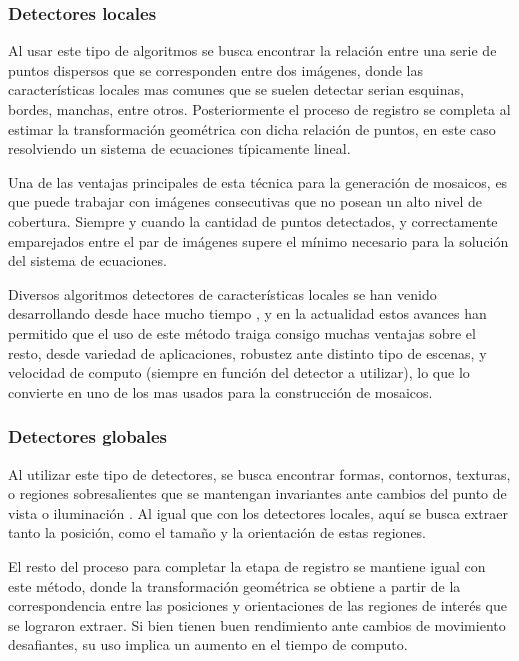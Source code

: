 \subsubsection*{Detectores locales}

Al usar este tipo de algoritmos se busca encontrar la relación entre una serie de puntos dispersos que se corresponden entre dos imágenes, donde las características locales mas comunes que se suelen detectar serian esquinas, bordes, manchas, entre otros. Posteriormente el proceso de registro se completa al estimar la transformación geométrica con dicha relación de puntos, en este caso resolviendo un sistema de ecuaciones típicamente lineal.

Una de las ventajas principales de esta técnica para la generación de mosaicos, es que puede trabajar con imágenes consecutivas que no posean un alto nivel de cobertura. Siempre y cuando la cantidad de puntos detectados, y correctamente emparejados entre el par de imágenes supere el mínimo necesario para la solución del sistema de ecuaciones.

Diversos algoritmos detectores de características locales se han venido desarrollando desde hace mucho tiempo \cite{harris,sift,surf,fast,brief,orb,kaze,akaze}, y en la actualidad estos avances han permitido que el uso de este método traiga consigo muchas ventajas sobre el resto, desde variedad de aplicaciones, robustez ante distinto tipo de escenas, y velocidad de computo (siempre en función del detector a utilizar), lo que lo convierte en uno de los mas usados para la construcción de mosaicos.

\subsubsection*{Detectores globales}

Al utilizar este tipo de detectores, se busca encontrar formas, contornos, texturas, o regiones sobresalientes que se mantengan invariantes ante cambios del punto de vista o iluminación \cite{high-level}. Al igual que con los detectores locales, aquí se busca extraer tanto la posición, como el tamaño y la orientación de estas regiones.

El resto del proceso para completar la etapa de registro se mantiene igual con este método, donde la transformación geométrica se obtiene a partir de la correspondencia entre las posiciones y orientaciones de las regiones de interés que se lograron extraer. Si bien tienen buen rendimiento ante cambios de movimiento desafiantes, su uso implica un aumento en el tiempo de computo.

